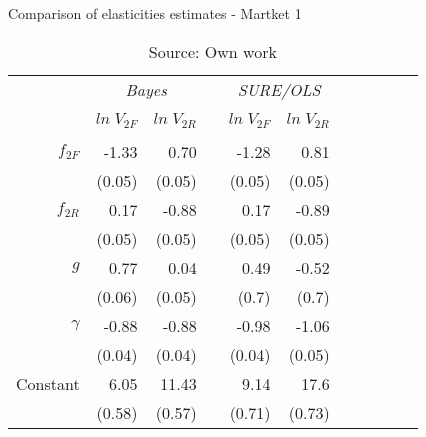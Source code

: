 \begin{table} [H]
\caption{Comparison of elasticities estimates - Martket 1}
\label{tbl:mkt1_weak}
\centering
\begin{tabular}{rrrrrrrrrrr}
  \toprule 
 & \multicolumn{2}{c}{\textit{Bayes}} & & \multicolumn{2}{c}{\textit{SURE/OLS}} \\ 
\cline{2-3} \cline{5-6}
\\[-1.8ex] & $ln \; V_{2F}$ & $ln \; V_{2R}$ & & $ln \; V_{2F}$ & $ln \; V_{2R}$ \\ 
\hline \\[-1.8ex] 

  $f_{2F}$ &-1.33  & 0.70 & &-1.28 & 0.81\\
  		   & (0.05)  & (0.05) & & (0.05) & (0.05)\\ [0.2cm]
  $f_{2R}$ & 0.17 & -0.88  & & 0.17 & -0.89 \\
  			& (0.05) &  (0.05) & & (0.05) & (0.05)\\ [0.2cm]
  $g$ & 0.77 & 0.04 & & 0.49 & \cellcolor{gray!25}-0.52 \\
  		& (0.06) & (0.05) & & (0.7) & (0.7)\\ [0.2cm]
  $\gamma$ & -0.88 & -0.88 & & -0.98 & -1.06\\
  			& (0.04) & (0.04) & & (0.04) & (0.05)\\ [0.2cm]
  Constant & 6.05 & 11.43 & & 9.14 & 17.6\\
  			& (0.58) & (0.57) & & (0.71) & (0.73)\\ [0.2cm]
\bottomrule
\end{tabular}
\caption*{Source: Own work}
\end{table}
